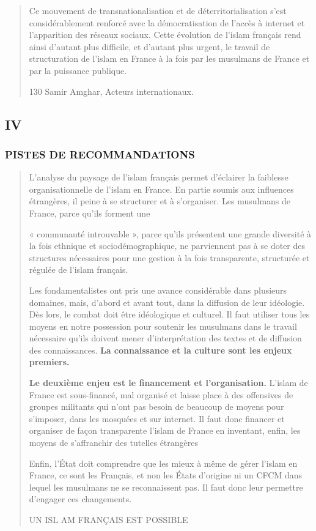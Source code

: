 \begin{quote}
Ce mouvement de transnationalisation et de déterritorialisation s'est
considérablement renforcé avec la démocratisation de l'accès à internet
et l'apparition des réseaux sociaux. Cette évolution de l'islam français
rend ainsi d'autant plus difficile, et d'autant plus urgent, le travail
de structuration de l'islam en France à la fois par les musulmans de
France et par la puissance publique.

130 Samir Amghar, Acteurs internationaux.
\end{quote}

\hypertarget{iv}{%
\subsection{IV}\label{iv}}

\hypertarget{pistes-de-recommandations}{%
\subsubsection{PISTES DE
RECOMMANDATIONS}\label{pistes-de-recommandations}}

\begin{quote}
L'analyse du paysage de l'islam français permet d'éclairer la faiblesse
organisationnelle de l'islam en France. En partie soumis aux influences
étrangères, il peine à se structurer et à s'organiser. Les musulmans de
France, parce qu'ils forment une

« communauté introuvable », parce qu'ils présentent une grande diversité
à la fois ethnique et sociodémographique, ne parviennent pas à se doter
des structures nécessaires pour une gestion à la fois transparente,
structurée et régulée de l'islam français.

Les fondamentalistes ont pris une avance considérable dans plusieurs
domaines, mais, d'abord et avant tout, dans la diffusion de leur
idéologie. Dès lors, le combat doit être idéologique et culturel. Il
faut utiliser tous les moyens en notre possession pour soutenir les
musulmans dans le travail nécessaire qu'ils doivent mener
d'interprétation des textes et de diffusion des connaissances.
\textbf{La connaissance et la culture sont les enjeux premiers.}

\textbf{Le deuxième enjeu est le financement et l'organisation.} L'islam
de France est sous-financé, mal organisé et laisse place à des
offensives de groupes militants qui n'ont pas besoin de beaucoup de
moyens pour s'imposer, dans les mosquées et sur internet. Il faut donc
financer et organiser de façon transparente l'islam de France en
inventant, enfin, les moyens de s'affranchir des tutelles étrangères

Enfin, l'État doit comprendre que les mieux à même de gérer l'islam en
France, ce sont les Français, et non les États d'origine ni un CFCM dans
lequel les musulmans ne se reconnaissent pas. Il faut donc leur
permettre d'engager ces changements.

UN ISL AM FRANÇAIS EST POSSIBLE
\end{quote}

